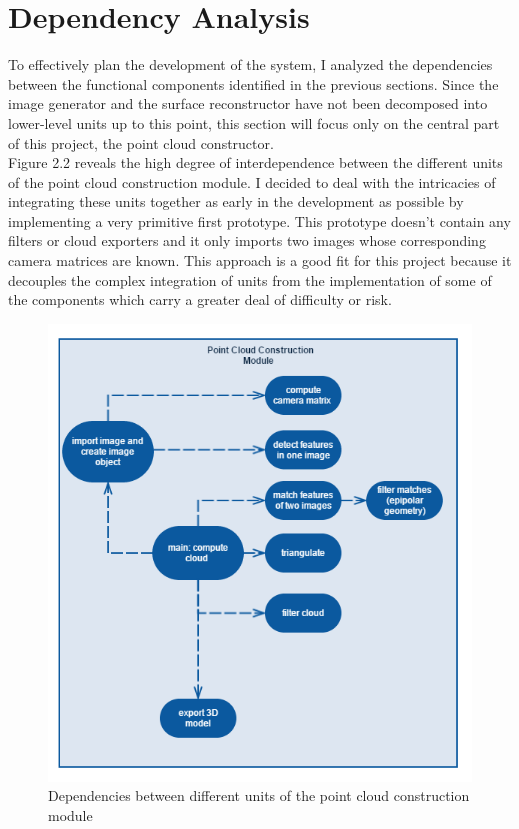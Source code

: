 \documentclass[12pt,a4paper,twoside,openright]{report}
\begin{document}
\section{Dependency Analysis}
To effectively plan the development of the system, I analyzed the dependencies between the functional components identified in the previous sections. Since the image generator and the surface reconstructor have not been decomposed into lower-level units up to this point, this section will focus only on the central part of this project, the point cloud constructor.\\
\pagebreak
Figure 2.2 reveals the high degree of interdependence between the different units of the point cloud construction module. I decided to deal with the intricacies of integrating these units together as early in the development as possible by implementing a very primitive first prototype. This prototype doesn't contain any filters or cloud exporters and it only imports two images whose corresponding camera matrices are known. This approach is a good fit for this project because it decouples the complex integration of units from the implementation of some of the components which carry a greater deal of difficulty or risk. 

\begin{figure}
\centerline{\includegraphics[scale=0.7]{figs/dependencies.png}}
\caption{Dependencies between different units of the point cloud construction module}
\end{figure}
\end{document}
